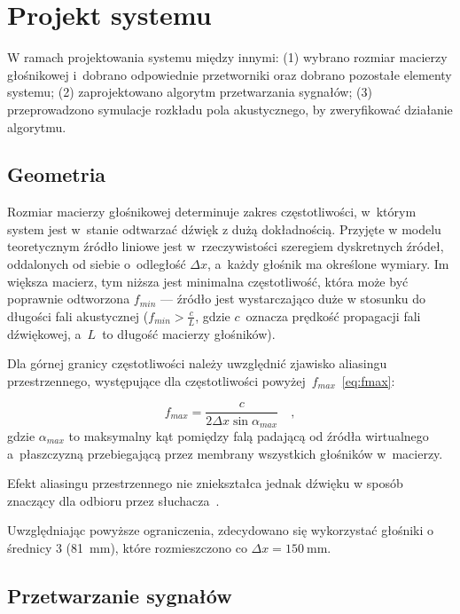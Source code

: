 \documentclass[10pt, a4paper]{article}
\let\Oldsection\section
\renewcommand{\section}{\FloatBarrier\Oldsection}
\let\Oldsubsection\subsection
\renewcommand{\subsection}{\FloatBarrier\Oldsubsection}
\begin{document}
\section{Projekt systemu}

W ramach projektowania systemu między innymi: (1) wybrano rozmiar macierzy
głośnikowej i~dobrano odpowiednie przetworniki oraz dobrano pozostałe elementy
systemu; (2) zaprojektowano algorytm przetwarzania sygnałów; (3) przeprowadzono
symulacje rozkładu pola akustycznego, by zweryfikować działanie algorytmu.

\subsection{Geometria}

Rozmiar macierzy głośnikowej determinuje zakres częstotliwości, w~którym system
jest w~stanie odtwarzać dźwięk z dużą dokładnością. Przyjęte w modelu teoretycznym
źródło liniowe jest w~rzeczywistości szeregiem dyskretnych źródeł, oddalonych od siebie
o~odległość $\Delta x$, a~każdy głośnik ma określone wymiary. Im większa macierz, tym niższa
jest minimalna częstotliwość, która może być poprawnie odtworzona $f_{min}$ --- źródło jest wystarczająco duże w stosunku
do długości fali akustycznej ($f_{min}>\frac{c}{L}$, gdzie $c$~oznacza prędkość propagacji fali dźwiękowej,
a~$L$~to długość macierzy głośników).

Dla górnej granicy częstotliwości należy uwzględnić zjawisko aliasingu
przestrzennego, występujące dla częstotliwości powyżej~$f_{max}$~\eqref{eq:fmax}:

\begin{equation}
  f_{max}=\frac{c}{2\Delta x \sin{\alpha_{max}}} \quad, \label{eq:fmax}
\end{equation}
gdzie $\alpha_{max}$ to maksymalny kąt pomiędzy falą padającą od źródła
wirtualnego a~płaszczyzną przebiegającą przez membrany wszystkich głośników w~macierzy.

Efekt aliasingu przestrzennego nie zniekształca jednak dźwięku w sposób znaczący dla odbioru przez
słuchacza~\cite{hq_rendering}.

Uwzględniając powyższe ograniczenia, zdecydowano się wykorzystać głośniki o średnicy \SI{3}{\inch}
(\SI{81}{\milli\meter}), które rozmieszczono co $\Delta x=\SI{150}{\milli\meter}$.

\subsection{Przetwarzanie sygnałów}\label{s:algorithm}
\end{document}
